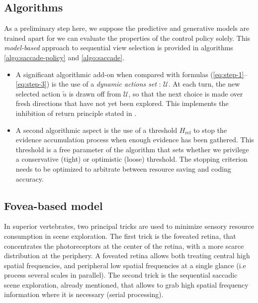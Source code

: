 \documentclass{article}
\begin{document}
\subsection{Algorithms}

As a preliminary step here, we suppose the predictive and generative models are trained apart for we  
can evaluate the properties of the control policy solely.  This \emph{model-based} approach to sequential view selection is provided in algorithms \ref{algo:saccade-policy} and \ref{algo:saccade}. 

\begin{itemize}
	\item A significant algorithmic add-on when compared with formulas (\ref{eq:step-1}--\ref{eq:step-3}) is the use of a \emph{dynamic actions set} : $\mathcal{U}$. At each turn, the new selected action $\tilde{u}$ is drawn off from $\mathcal{U}$, so that the next choice is made over fresh directions that have not yet been explored. This implements the inhibition of return principle stated in \cite{itti2001computational}.
	\item A second algorithmic aspect is the use of a threshold $H_\text{ref}$ to stop the evidence accumulation process when enough evidence has been gathered. This threshold is a free parameter of the algorithm that sets whether we privilege a conservative (tight) or optimistic (loose) threshold. The stopping criterion needs to be optimized to arbitrate between resource saving and coding accuracy. 
\end{itemize}




\subsection{Fovea-based model}

In superior vertebrates, two principal tricks are used to minimize sensory resource consumption in scene exploration. The first trick is the foveated retina, that concentrates the photoreceptors at the center of the retina, with a more scarce distribution at the periphery. A foveated retina allows both treating central high spatial frequencies, and peripheral low spatial frequencies at a single glance (i.e process several scales in parallel). The second trick is the sequential saccadic scene exploration, already mentioned, that allows to grab high spatial frequency information where it is necessary (serial processing).
\end{document}
